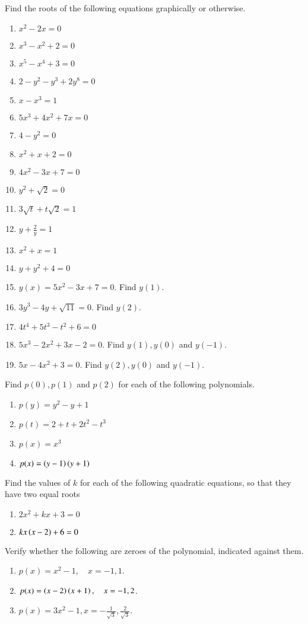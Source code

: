 Find the roots of the following equations graphically or otherwise.
\begin{enumerate}[label=\thesubsection.\arabic*, ref=\thesubsection.\theenumi]
	\item $x^2-2x=0$
	\item $x^3-x^2+2=0$
	\item $x^5-x^4+3=0$
	\item $2-y^2-y^3+2y^8=0$
	\item $x-x^3=1$
	\item $5x^3+4x^2+7x=0$
	\item $4-y^2=0$
	\item $x^2+x+2 = 0$
	\item $4x^2-3x+7 = 0$
	\item $y^2+\sqrt{2} = 0$
	\item $3\sqrt{t}+t\sqrt{2} = 1$
	\item $y+\frac{2}{y} = 1$
	\item $x^2+x = 1$
	\item $y+{y}^2+4 = 0$
	\item $y(x)=5x^2-3x+7 = 0$.  Find $y(1).$
	\item $3y^3-4y+\sqrt{11}=0$.  Find $y(2).$
	\item $4t^4+5t^3-t^2+6=0$
	\item $5x^3-2x^2+3x-2=0$.  Find $y(1), y(0)$ and $y(-1)$.
	\item $5x-4x^2+3=0$.  Find $y(2), y(0)$ and $y(-1)$.
\end{enumerate}
Find $p(0), p(1)$ and $p(2)$ for each of the following polynomials.
\begin{enumerate}[label=\thesubsection.\arabic*, ref=\thesubsection.\theenumi,resume*]
	\item $p(y)=y^2-y+1$
	\item $p(t)=2+t+2t^2-t^3$
	\item $p(x)=x^3$
	\item $p(x)=\left(y-1\right)\left(y+1\right)$
\end{enumerate}
Find the values of $k$ for each of the following quadratic equations, so that they have two equal roots
\begin{enumerate}[label=\thesubsection.\arabic*, ref=\thesubsection.\theenumi,resume*]
\item 	$2x^2+kx+3 = 0$
\item 	$kx\left(x-2\right)+6= 0$
\end{enumerate}
Verify whether the following are zeroes of the polynomial, indicated against them.
\begin{enumerate}[label=\thesubsection.\arabic*, ref=\thesubsection.\theenumi,resume*]
	\item $p(x) = x^2-1, \quad x=-1, 1$.
	\item $p(x) = \left(x-2\right)\left(x+1\right), \quad x=-1, 2$.
	\item $p(x) = 3x^2-1, x=-\frac{1}{\sqrt{3}},\frac{2}{\sqrt{3}}$.
\end{enumerate}
